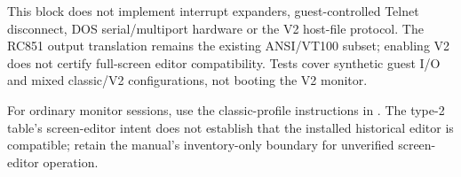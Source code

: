 This block does not implement interrupt expanders, guest-controlled Telnet disconnect, DOS serial/multiport hardware or the V2 host-file protocol. The RC851 output translation remains the existing ANSI/VT100 subset; enabling V2 does not certify full-screen editor compatibility. Tests cover synthetic guest I/O and mixed classic/V2 configurations, not booting the V2 monitor.

For ordinary monitor sessions, use the classic-profile instructions in . The type-2 table's screen-editor intent does not establish that the installed historical editor is compatible; retain the manual's inventory-only boundary for unverified screen-editor operation.
